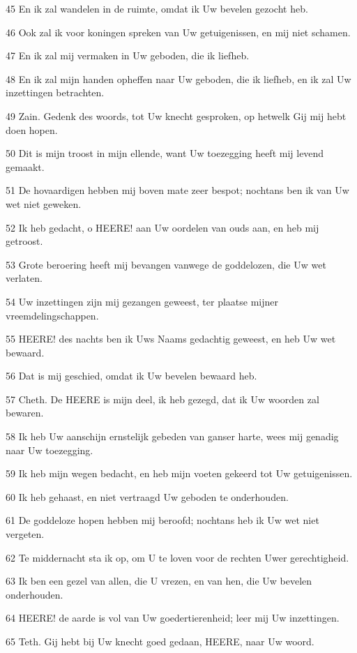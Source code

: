 \par 45 En ik zal wandelen in de ruimte, omdat ik Uw bevelen gezocht heb.
\par 46 Ook zal ik voor koningen spreken van Uw getuigenissen, en mij niet schamen.
\par 47 En ik zal mij vermaken in Uw geboden, die ik liefheb.
\par 48 En ik zal mijn handen opheffen naar Uw geboden, die ik liefheb, en ik zal Uw inzettingen betrachten.
\par 49 Zain. Gedenk des woords, tot Uw knecht gesproken, op hetwelk Gij mij hebt doen hopen.
\par 50 Dit is mijn troost in mijn ellende, want Uw toezegging heeft mij levend gemaakt.
\par 51 De hovaardigen hebben mij boven mate zeer bespot; nochtans ben ik van Uw wet niet geweken.
\par 52 Ik heb gedacht, o HEERE! aan Uw oordelen van ouds aan, en heb mij getroost.
\par 53 Grote beroering heeft mij bevangen vanwege de goddelozen, die Uw wet verlaten.
\par 54 Uw inzettingen zijn mij gezangen geweest, ter plaatse mijner vreemdelingschappen.
\par 55 HEERE! des nachts ben ik Uws Naams gedachtig geweest, en heb Uw wet bewaard.
\par 56 Dat is mij geschied, omdat ik Uw bevelen bewaard heb.
\par 57 Cheth. De HEERE is mijn deel, ik heb gezegd, dat ik Uw woorden zal bewaren.
\par 58 Ik heb Uw aanschijn ernstelijk gebeden van ganser harte, wees mij genadig naar Uw toezegging.
\par 59 Ik heb mijn wegen bedacht, en heb mijn voeten gekeerd tot Uw getuigenissen.
\par 60 Ik heb gehaast, en niet vertraagd Uw geboden te onderhouden.
\par 61 De goddeloze hopen hebben mij beroofd; nochtans heb ik Uw wet niet vergeten.
\par 62 Te middernacht sta ik op, om U te loven voor de rechten Uwer gerechtigheid.
\par 63 Ik ben een gezel van allen, die U vrezen, en van hen, die Uw bevelen onderhouden.
\par 64 HEERE! de aarde is vol van Uw goedertierenheid; leer mij Uw inzettingen.
\par 65 Teth. Gij hebt bij Uw knecht goed gedaan, HEERE, naar Uw woord.
